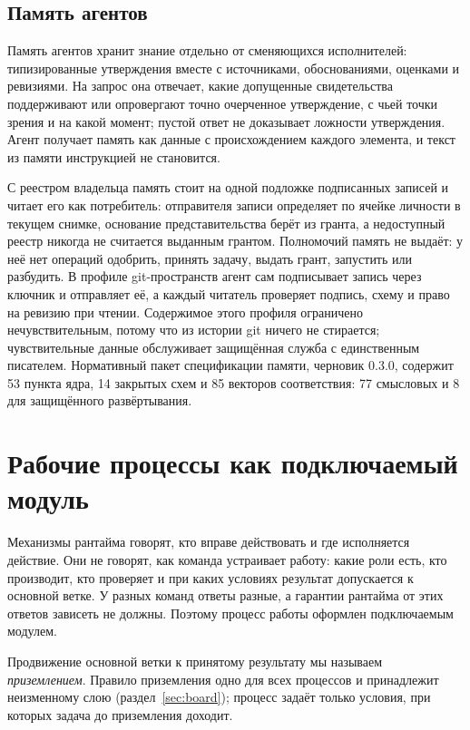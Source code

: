 \documentclass[10pt,a4paper]{article}
\begin{document}
\subsection{Память агентов}
\label{sec:memory}

Память агентов хранит знание отдельно от сменяющихся исполнителей: типизированные утверждения вместе с источниками, обоснованиями, оценками и ревизиями. На запрос она отвечает, какие допущенные свидетельства поддерживают или опровергают точно очерченное утверждение, с чьей точки зрения и на какой момент; пустой ответ не доказывает ложности утверждения. Агент получает память как данные с происхождением каждого элемента, и текст из памяти инструкцией не становится.

С реестром владельца память стоит на одной подложке подписанных записей и читает его как потребитель: отправителя записи определяет по ячейке личности в текущем снимке, основание представительства берёт из гранта, а недоступный реестр никогда не считается выданным грантом. Полномочий память не выдаёт: у неё нет операций одобрить, принять задачу, выдать грант, запустить или разбудить. В профиле git-пространств агент сам подписывает запись через ключник и отправляет её, а каждый читатель проверяет подпись, схему и право на ревизию при чтении. Содержимое этого профиля ограничено нечувствительным, потому что из истории git ничего не стирается; чувствительные данные обслуживает защищённая служба с единственным писателем. Нормативный пакет спецификации памяти, черновик 0.3.0, содержит 53 пункта ядра, 14 закрытых схем и 85 векторов соответствия: 77 смысловых и 8 для защищённого развёртывания.

\section{Рабочие процессы как подключаемый модуль}
\label{sec:workflow}

Механизмы рантайма говорят, кто вправе действовать и где исполняется действие. Они не говорят, как команда устраивает работу: какие роли есть, кто производит, кто проверяет и при каких условиях результат допускается к основной ветке. У разных команд ответы разные, а гарантии рантайма от этих ответов зависеть не должны. Поэтому процесс работы оформлен подключаемым модулем.

Продвижение основной ветки к принятому результату мы называем \emph{приземлением}. Правило приземления одно для всех процессов и принадлежит неизменному слою (раздел~\ref{sec:board}); процесс задаёт только условия, при которых задача до приземления доходит.
\end{document}

